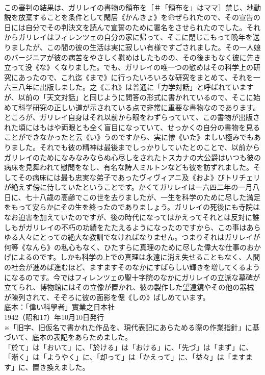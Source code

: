 \documentclass[8pt]{extreport}
\begin{document}
\begin{CJK}{UTF8}{min}
\\	この審判の結果は、ガリレイの書物の領布を［＃「領布を」はママ］禁じ、地動説を放棄することを条件として閑居《かんきょ》を命ぜられたので、その宣告の日には自分でその判決文を読んで宣誓のために署名をさせられたのでした。それからガリレイはフィレンツェの自分の家に帰って、そこに閉じこもって晩年を送りましたが、この間の彼の生活は実に寂しい有様ですごされました。その一人娘のバージニアが彼の病苦をやさしく慰めはしたものの、その後まもなく彼に先き立って没《な》くなりました。でも、ガリレイの唯一つの慰めはその科学上の研究にあったので、これ迄《まで》に行ったいろいろな研究をまとめて、それを一六三八年に出版しました。之《これ》は普通に「力学対話」と呼ばれていますが、以前の「天文対話」と同じように問答の形式に書かれているので、そこに始めて科学研究の正しい道が示されている点で非常に重要な書物なのであります。
\\	ところが、ガリレイ自身はそれ以前から眼をわずらっていて、この書物が出版された頃にはもはや両眼とも全く盲目になっていて、せっかくの自分の書物を見ることができなかったと云《い》うのですから、実に惨《いた》ましい極みでもありました。それでも彼の精神は最後までしっかりしていたとのことで、以前からガリレイのためになみなみならぬ心尽しをされたトスカナの大公爵はいつも彼の病床を見舞われて慰問をなし、有名な詩人ミルトンなども彼を訪ずれました。そしてその病床には最も忠実な弟子であったヴィヴィアニ及《およ》びトリチェリが絶えず傍に侍していたということです。かくてガリレイは一六四二年の一月八日に、七十八歳の高齢でこの世を去りましたが、一生を科学のために尽した満足をもって安らかにその生を終ったのでありましょう。ガリレイの死後にも寺院はなお迫害を加えていたのですが、後の時代になってはかえってそれとは反対に誰しもがガリレイの不朽の功績をたたえるようになったのですから、この事はあらゆる人々にとっての絶大な教訓でなければなりません。つまりそれはガリレイが何等《なんら》の私心もなく、ひたすらに真理のために尽した偉大な仕事のおかげによるのです。しかも科学の上での真理は永遠に消え失せることもなく、人間の社会が進めば進むほど、ますますそのなかにすばらしい輝きを増してくるようになるのです。今ではフィレンツェの聖十字院のなかにガリレイの立派な墓碑が立てられ、博物館にはその立像が置かれ、彼の製作した望遠鏡やその他の器械が陳列されて、そぞろに彼の面影を偲《しの》ばしめています。
\\	底本：「偉い科學者」實業之日本社
\\	1942（昭和17）年10月10日発行
\\	※「旧字、旧仮名で書かれた作品を、現代表記にあらためる際の作業指針」に基づいて、底本の表記をあらためました。
\\	「於て」は「おいて」に、「於ける」は「おける」に、「先づ」は「まず」に、「漸く」は「ようやく」に、「却って」は「かえって」に、「益々」は「ますます」に、置き換えました。

\end{CJK}
\end{document}
